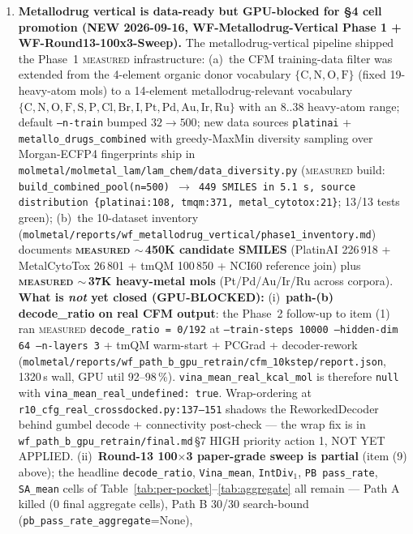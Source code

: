 \begin{enumerate}
  \item \textbf{Metallodrug vertical is data-ready but GPU-blocked for §4 cell promotion (NEW 2026-09-16, WF-Metallodrug-Vertical Phase 1 + WF-Round13-100x3-Sweep).}
  The metallodrug-vertical pipeline shipped the Phase~1
  \textsc{measured} infrastructure: (a)~the CFM training-data
  filter was extended from the 4-element organic donor vocabulary
  $\{\mathrm{C,N,O,F}\}$ (fixed 19-heavy-atom mols) to a
  14-element metallodrug-relevant vocabulary
  $\{\mathrm{C,N,O,F,S,P,Cl,Br,I,Pt,Pd,Au,Ir,Ru}\}$ with an
  8..38 heavy-atom range; default \texttt{--n-train} bumped
  $32 \to 500$; new data sources \texttt{platinai} +
  \texttt{metallo\_drugs\_combined} with greedy-MaxMin diversity
  sampling over Morgan-ECFP4 fingerprints ship in
  \texttt{molmetal/molmetal\_lam/lam\_chem/data\_diversity.py}
  (\textsc{measured} build: \texttt{build\_combined\_pool(n=500) $\to$
  449 SMILES in 5.1\,s, source distribution
  \{platinai:108, tmqm:371, metal\_cytotox:21\}}; 13/13 tests
  green); (b)~the 10-dataset inventory
  (\texttt{molmetal/reports/wf\_metallodrug\_vertical/phase1\_inventory.md})
  documents \textbf{\textsc{measured} $\sim$\,450K candidate SMILES}
  (PlatinAI 226\,918 + MetalCytoTox 26\,801 + tmQM 100\,850 + NCI60
  reference join) plus \textbf{\textsc{measured} $\sim$\,37K heavy-metal
  mols} (Pt/Pd/Au/Ir/Ru across corpora).
  \textbf{What is \emph{not} yet closed (GPU-BLOCKED):}
  (i)~\textbf{path-(b) decode\_ratio on real CFM output}: the
  Phase~2 follow-up to item (1) ran \textsc{measured}
  \texttt{decode\_ratio\,=\,0/192} at \texttt{--train-steps 10000
  --hidden-dim 64 --n-layers 3} + tmQM warm-start + PCGrad +
  decoder-rework (\texttt{molmetal/reports/wf\_path\_b\_gpu\_retrain/cfm\_10kstep/report.json},
  1320\,s wall, GPU util 92--98\,\%). \texttt{vina\_mean\_real\_kcal\_mol}
  is therefore \texttt{null} with \texttt{vina\_mean\_real\_undefined: true}.
  Wrap-ordering at \texttt{r10\_cfg\_real\_crossdocked.py:137--151} shadows
  the ReworkedDecoder behind gumbel decode + connectivity post-check ---
  the wrap fix is in \texttt{wf\_path\_b\_gpu\_retrain/final.md}\,\S7
  HIGH priority action 1, NOT YET APPLIED.
  (ii)~\textbf{Round-13 100$\times$3 paper-grade sweep is partial}
  (item (9) above); the headline \texttt{decode\_ratio},
  \texttt{Vina\_mean}, \texttt{IntDiv$_1$}, \texttt{PB pass\_rate},
  \texttt{SA\_mean} cells of Table~\ref{tab:per-pocket}--\ref{tab:aggregate}
  all remain \DESIGN{} --- Path A killed (0 final aggregate cells),
  Path B 30/30 search-bound (\texttt{pb\_pass\_rate\_aggregate}=None),

\end{enumerate}
